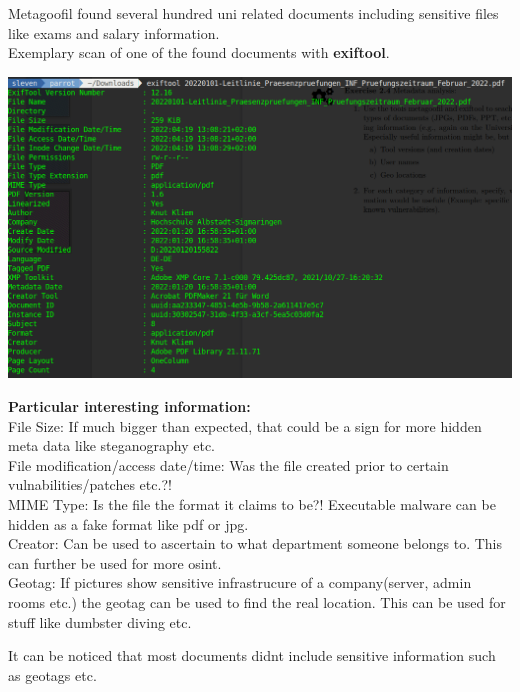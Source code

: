 \documentclass[a4paper,10pt]{article}
\begin{document}
\noindent Metagoofil found several hundred uni related documents including sensitive files like exams and salary information.\\
Exemplary scan of one of the found documents with \textbf{exiftool}. 
\begin{center}

\includegraphics[scale=0.35]{exif.png} 
\end{center}
\textbf{Particular interesting information:}\\
File Size: If much bigger than expected, that could be a sign for more hidden meta data like steganography etc.\\
File modification/access date/time: Was the file created prior to certain vulnabilities/patches etc.?! \\
MIME Type: Is the file the format it claims to be?! Executable malware can be hidden as a fake format like pdf or jpg.\\
Creator: Can be used to ascertain to what department someone belongs to. This can further be used for more osint.\\
Geotag: If pictures show sensitive infrastrucure of a company(server, admin rooms etc.) the geotag can be used to find the real location. This can be used for stuff like dumbster diving etc.  \\
\vspace{3mm}

\noindent It can be noticed that most documents didnt include sensitive information such as geotags etc.
\end{document}
